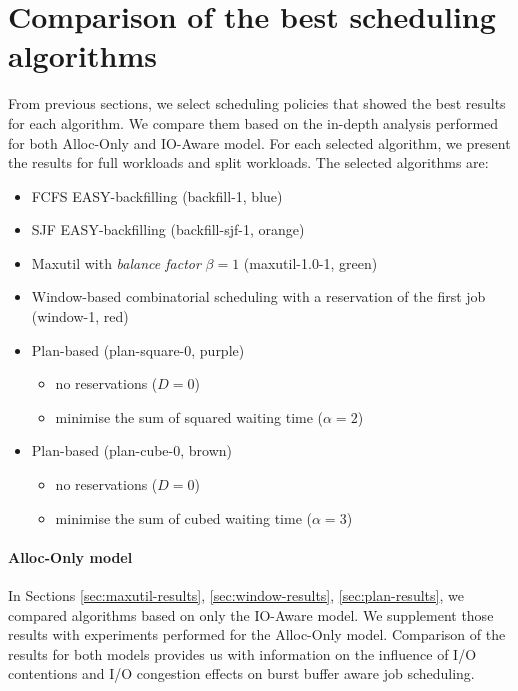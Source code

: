 \documentclass[thesis-en.tex]{subfiles}
\begin{document}
\FloatBarrier

\section{Comparison of the best scheduling algorithms} \label{sec:best}
From previous sections, we select scheduling policies that showed the best results for each algorithm. We compare them based on the in-depth analysis performed for both Alloc-Only and IO-Aware model. For each selected algorithm, we present the results for full workloads and split workloads. The selected algorithms are:
\begin{itemize}
    \item FCFS EASY-backfilling (backfill-1, blue)
    \item SJF EASY-backfilling (backfill-sjf-1, orange)
    \item Maxutil with \emph{balance factor} $\beta=1$ (maxutil-1.0-1, green)
    \item Window-based combinatorial scheduling with a reservation of the first job (window-1, red)
    \item Plan-based (plan-square-0, purple)
    \begin{itemize}
        \item no reservations ($D=0$)
        \item minimise the sum of squared waiting time ($\alpha=2$)
    \end{itemize}
    \item Plan-based (plan-cube-0, brown)
    \begin{itemize}
        \item no reservations ($D=0$)
        \item minimise the sum of cubed waiting time ($\alpha=3$)
    \end{itemize}
\end{itemize}

\paragraph{Alloc-Only model}
In Sections \ref{sec:maxutil-results}, \ref{sec:window-results}, \ref{sec:plan-results}, we compared algorithms based on only the IO-Aware model. We supplement those results with experiments performed for the Alloc-Only model. Comparison of the results for both models provides us with information on the influence of I/O contentions and I/O congestion effects on burst buffer aware job scheduling.
\end{document}
